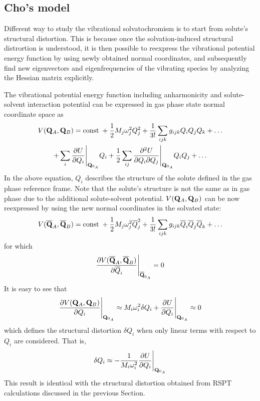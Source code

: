 \documentclass[a4paper,titlepage,twoside,fleqn,12pt]{book}
\begin{document}
\begin{refsection}
\section{Cho's model}

Different way to study the vibrational solvatochromism is to start from
solute's structural distortion. 
This is because once the solvation-induced structural distrortion is 
understood, it is then possible to reexpress the vibrational potential energy function
by using newly obtained normal coordinates, and subsequently find new eigenvectors and eigenfrequencies
of the vibrating species by analyzing the Hessian matrix explicitly.

The vibrational potential energy function including anharmonicity 
and solute-solvent interaction potential
can be expressed in gas phase state normal coordinate space as
%
\begin{multline} \label{e:vib-pot-energy-function}
 V({\bf Q}_A,{\bf Q}_B) = {\rm const}\;+
\frac{1}{2} M_j \omega_j^2 Q_j^2 + \frac{1}{3!} \sum_{ijk}  g_{ijk} Q_iQ_jQ_k + \ldots \\
+ \sum_i \frac{\partial U}{\partial Q_i} \Bigg|_{{\bf Q}_{0_A}} Q_i
+ \frac{1}{2} \sum_{ij} \frac{\partial^2 U}{\partial Q_i \partial Q_j} \Bigg|_{{\bf Q}_{0_A}} Q_iQ_j
+ \ldots
\end{multline}
%
In the above equation, $Q_i$ describes the structure of the solute
defined in the gas phase reference frame. Note that the solute's structure 
is not the same as in gas phase due to the additional solute\hyp{}solvent potential.
$V({\bf Q}_A,{\bf Q}_B)$ can be now reexpressed by using the new normal coordinates in the solvated
state:
%
\begin{equation} \label{e:vib-pot-energy-function-new}
V(\overline{{\bf Q}}_A,\overline{{\bf Q}}_B) = {\rm const}\;+
\frac{1}{2} M_j \omega_j^2 \overline{Q}_j^2 + \frac{1}{3!} \sum_{ijk}  g_{ijk} \overline{Q}_i\overline{Q}_j\overline{Q}_k + \ldots
\end{equation}
%
for which 
%
\begin{equation} \label{e:vib-pot-energy-function-new.condition}
\frac{\partial V(\overline{{\bf Q}}_A,\overline{{\bf Q}}_B)}
{\partial \overline{Q}_i} \Bigg|_{{\bf \overline{Q}}_{0_A}} = 0
\end{equation}
%
It is easy to see that
%
\begin{equation} \label{e:x863}
\frac{\partial V({{\bf Q}}_A,{{\bf Q}}_B)}
{\partial Q_i} \Bigg|_{{\bf Q}_{0_A}} \approx 
M_i \omega_i^2 \delta Q_i + \frac{\partial U}{\partial Q_i} \Bigg|_{{\bf Q}_{0_A}} 
\approx 0
\end{equation}
%
which defines the structural distortion $\delta Q_i$ when only linear terms with respect to $Q_i$
are considered. That is,
%
\begin{equation} \label{e:struct-dist-cho}
\delta Q_i \approx - \frac{1}{M_i \omega_i^2} \frac{\partial U}{\partial Q_i} \Bigg|_{{\bf Q}_{0_A}} 
\end{equation}
%
This result is identical with the structural distortion
obtained from RSPT calculations discussed in the previous Section.


\end{refsection}
\end{document}
